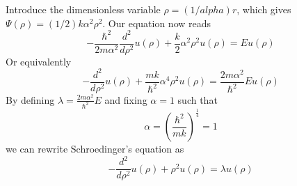 \documentclass[%
reprint,
nofootinbib,
amsmath,amssymb,
aps,
]{revtex4-1}
\begin{document}
Introduce the dimensionless variable $\rho = (1/alpha)r$, which gives $\Psi(\rho) = (1/2)k\alpha^2\rho^2$. Our equation now reads
\begin{equation}
	-\frac{\hbar^2}{2m\alpha^2}\frac{d^2}{d\rho^2}u(\rho) + \frac{k}{2}\alpha^2\rho^2u(\rho) = Eu(\rho)
\end{equation} 
Or equivalently
\begin{equation}
	-\frac{d^2}{d\rho^2}u(\rho) + \frac{mk}{\hbar^2}\alpha^4\rho^2u(\rho) = \frac{2m\alpha^2}{\hbar^2}Eu(\rho)
\end{equation}
By defining $\lambda = \frac{2m\alpha^2}{\hbar^2}E$ and fixing $\alpha = 1$ such that 
\begin{equation}
	\alpha = \left(\frac{\hbar^2}{mk}\right)^{\frac{1}{4}} = 1
\end{equation}
we can rewrite Schroedinger's equation as 
\begin{equation}\label{Scaled Schro}
	-\frac{d^2}{d\rho^2}u(\rho) +\rho^2u(\rho) = \lambda u(\rho)
\end{equation}



\end{document}
